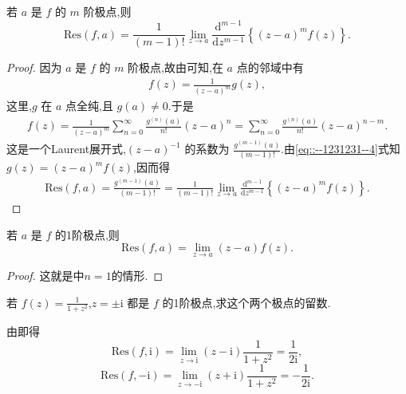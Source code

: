 \documentclass[../../main.tex]{subfiles}
\begin{document}
\begin{proposition}\label{proposition:命题5.4.2}
若 \( a \) 是 \( f \) 的 \( m \) 阶极点,则
\[
\mathrm{Res}(f,a) = \frac{1}{(m - 1)!} \lim_{z \to a} \frac{\mathrm{d}^{m - 1}}{\mathrm{d}z^{m - 1}} \left\{ (z - a)^m f(z) \right\}.
\]
\end{proposition}
\begin{proof}
因为 \( a \) 是 \( f \) 的 \( m \) 阶极点,故由可知,在 \( a \) 点的邻域中有
\begin{align}
f(z) = \frac{1}{(z - a)^m} g(z), 
\label{eq::--1231231--4}
\end{align}
这里,\( g \) 在 \( a \) 点全纯,且 \( g(a) \neq 0 \).于是
\begin{align*}
f(z) = \frac{1}{(z - a)^m} \sum_{n = 0}^{\infty} \frac{g^{(n)}(a)}{n!} (z - a)^n = \sum_{n = 0}^{\infty} \frac{g^{(n)}(a)}{n!} (z - a)^{n - m}.
\end{align*}
这是一个Laurent展开式,\( (z - a)^{-1} \) 的系数为 \( \frac{g^{(m - 1)}(a)}{(m - 1)!} \).由\eqref{eq::--1231231--4}式知 \( g(z) = (z - a)^m f(z) \),因而得
\begin{align*}
\mathrm{Res}(f,a) = \frac{g^{(m - 1)}(a)}{(m - 1)!} = \frac{1}{(m - 1)!} \lim_{z \to a} \frac{\mathrm{d}^{m - 1}}{\mathrm{d}z^{m - 1}} \left\{ (z - a)^m f(z) \right\}.
\end{align*}

\end{proof}

\begin{proposition}\label{proposition:命题5.4.3}
若 \( a \) 是 \( f \) 的1阶极点,则
\[
\mathrm{Res}(f,a) = \lim_{z \to a} (z - a) f(z).
\]
\end{proposition}
\begin{proof}
这就是中$n=1$的情形.

\end{proof}

\begin{example}
若 \( f(z) = \frac{1}{1 + z^2} \),\( z = \pm \mathrm{i} \) 都是 \( f \) 的1阶极点,求这个两个极点的留数.
\end{example}
\begin{solution}
由即得
\[
\mathrm{Res}(f,\mathrm{i}) = \lim_{z \to \mathrm{i}} (z - \mathrm{i}) \frac{1}{1 + z^2} = \frac{1}{2\mathrm{i}},
\]
\[
\mathrm{Res}(f, -\mathrm{i}) = \lim_{z \to -\mathrm{i}} (z + \mathrm{i}) \frac{1}{1 + z^2} = -\frac{1}{2\mathrm{i}}.
\]

\end{solution}
\end{document}

